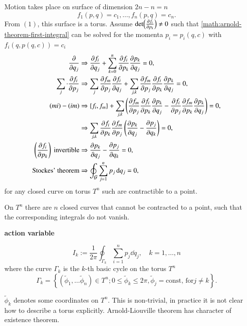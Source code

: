 Motion takes place on surface of dimension $2n -n = n$
\begin{equation}
	f_1 (p,q) = c_1, \dots, f_n(p, q) = c_n .
	\label{math:arnold-theorem-first-integral}
\end{equation}
From $(1)$, this surface is a torus. Assume $\det(\pdv{f_i}{p_k}) \neq 0$ such that \eqref{math:arnold-theorem-first-integral} can be solved for the momenta $p_i = p_i (q, c)$ with $f_i(q, p(q,c )) = c_i$
\begin{align*}
	\pdv{q_j} & \Rightarrow \pdv{f_i}{q_j} + \sum_{k=0}^{n} \pdv{f_i}{p_k} \pdv{p_k}{q_j} = 0, \\
	 \sum_j \cdot \pdv{f_i}{p_j} &\Rightarrow \sum_j \pdv{f_m}{p_j} \pdv{f_i}{q_j} + \sum_{j, k} \pdv{f_m}{p_j}\pdv{f_i}{p_k} \pdv{p_k}{q_j} = 0, \\
	(mi) - (im) &\Rightarrow \pb{f_i}{f_m} + \sum_{j, k} \left( \pdv{f_m}{p_j} \pdv{f_i}{p_k} \pdv{p_k}{q_j} - \pdv{f_i}{p_j} \pdv{f_m}{p_k} \pdv{p_k}{q_j} \right)  = 0, \\
					&\Rightarrow \sum_{j, k} \pdv{f_i}{p_k} \pdv{f_m}{p_j} \left( \pdv{p_k}{q_j} - \pdv{p_j}{q_k} \right)  = 0, \\
	\left( \pdv{f_i}{p_k} \right) \text{ invertible} &\Rightarrow \pdv{p_k}{q_j} - \pdv{p_j}{q_k} = 0, \\
	\text{Stockes' theorem} &\Rightarrow \oint_{\mathcal{G}} \sum_{j=1}^{n} p_j \dd{q_j} = 0,
\end{align*}
for any closed curve on torus $T^n$ such are contractible to a point. 

On $T^n$ there are $n$ closed curves that cannot be contracted to a point, such that the corresponding integrals do not vanish.

\begin{definition}
\textbf{action variable}

\begin{equation}
	I_k := \frac{1}{2\pi} \oint_{\Gamma_k} \sum_{i=1}^{n} p_j \dd{q_j}, \quad k = 1, \dots, n
	\label{math:action-variable-def}
\end{equation}
where the curve $\Gamma_k$ is the $k$-th basic cycle on the torus $T^n$
\begin{equation*}
\Gamma_k = \left\{ (\tilde{\phi}_1, \dots \tilde{\phi}_n) \in T^n; 0 \leq \tilde{\phi}_k \leq 2\pi, \tilde{\phi}_j = \text{const, for} j\neq k  \right\}.
\end{equation*}

\end{definition}
$\tilde{\phi}_k$ denotes some coordinates on $T^n$. This is non-trivial, in practice it is not clear how to describe a torus explicitly. Arnold-Liouville theorem has character of existence theorem. 


